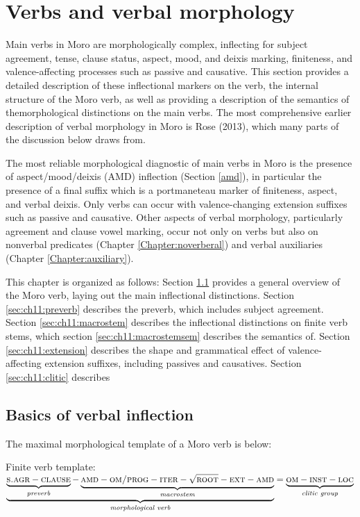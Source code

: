 
\chapter{Verbs and verbal morphology}\label{chapter:verbs}

Main verbs in Moro are morphologically complex, inflecting for subject agreement, tense, clause status, aspect, mood, and deixis marking, finiteness, and valence-affecting processes such as passive and causative. This section provides a detailed description of these inflectional markers on the verb, the internal structure of the Moro verb, as well as providing a description of the semantics of themorphological distinctions on the main verbs. The most comprehensive earlier description of verbal morphology in Moro is Rose (2013), which many parts of the discussion below draws from. 

The most reliable morphological diagnostic of main verbs in Moro is the presence of aspect/mood/deixis (AMD) inflection (Section \ref{amd}), in particular the presence of a final suffix which is a portmaneteau marker of finiteness, aspect, and verbal deixis. Only verbs can occur with valence-changing extension suffixes such as passive and causative. Other aspects of verbal morphology, particularly agreement and clause vowel marking, occur not only on verbs but also on nonverbal predicates (Chapter \ref{Chapter:noverberal}) and verbal auxiliaries (Chapter \ref{Chapter:auxiliary}).

This chapter is organized as follows: Section \ref{sec:ch11:inflection} provides a general overview of the Moro verb, laying out the main inflectional distinctions. Section \ref{sec:ch11:preverb} describes the preverb, which includes subject agreement. Section \ref{sec:ch11:macrostem} describes the inflectional distinctions on finite verb stems, which section \ref{sec:ch11:macrostemsem} describes the semantics of. Section \ref{sec:ch11:extension} describes the shape and grammatical effect of valence-affecting extension suffixes, including passives and causatives. Section \ref{sec:ch11:clitic} describes 


\section{Basics of verbal inflection}\label{sec:ch11:inflection}

The maximal morphological template of a Moro verb is below:

\ea   \label{template} {Finite verb template}:\\ 
$\underbrace{\underbrace{\textsc{s.agr} - \textsc{clause}}_\textit{preverb}-  \underbrace{\textsc{amd} - \textsc{om/prog} - \textsc{iter} - \sqrt{\textsc{root}} - \textsc{ext} - \textsc{amd}}_\textit{macrostem}}_\textit{morphological verb}= \underbrace{\textsc{om}-\textsc{inst}-\textsc{loc}}_\textit{clitic group}$
\z 

